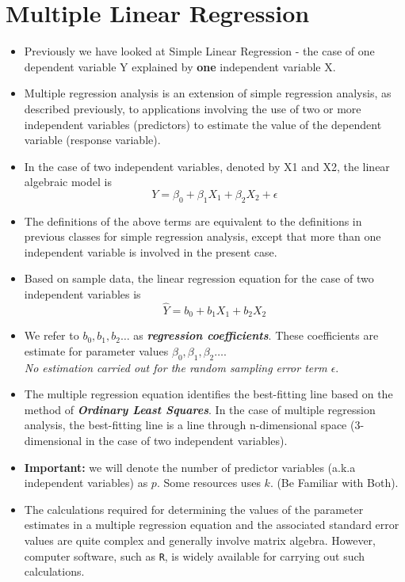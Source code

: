 \documentclass[a4paper,12pt]{article}
\begin{document}
\section{Multiple Linear Regression} 
\large
\begin{itemize}
\item Previously we have looked at Simple Linear Regression -  the case of one dependent variable Y explained by \textbf{one} independent variable X. 

\item Multiple regression analysis is an extension of simple regression analysis, as described previously, to applications involving the use of two or more independent variables (predictors) to estimate the value of the dependent variable (response variable).

\item In the case of two independent variables, denoted by X1 and X2, the linear algebraic model is
\[ Y= \beta_0 + \beta_1 X_1 + \beta_2 X_2 + \epsilon \]

\item The definitions of the above terms are equivalent to the definitions in previous classes for simple regression analysis, except that more than one independent variable is involved in the present case.
\item 
Based on sample data, the linear regression equation for the case of two independent variables is
\[ \hat{Y} = b_0 + b_1 X_1 + b_2 X_2 \]
\item We refer to $b_0, b_1 , b_2 \ldots$ as \textbf{\textit{regression coefficients}}. These coefficients are estimate for parameter values $\beta_0 , \beta_1 , \beta_2 \ldots$. \\ \textit{No estimation carried out for the random sampling error term $\epsilon$}.

\item The multiple regression equation identifies the best-fitting line based on the method of \textbf{\textit{Ordinary Least Squares}}. In the case of multiple regression analysis, the best-fitting line is a line through n-dimensional space (3-dimensional in the case of two independent variables).

\newpage

\item \textbf{Important:}  we will denote the number of predictor variables (a.k.a independent variables) as $p$. Some resources uses $k$.
(Be Familiar with Both).

\item The calculations required for determining the values of the parameter estimates in a multiple regression equation and the associated standard error values are quite complex and generally involve matrix algebra. However, computer software, such as \texttt{R}, is widely available for carrying out such calculations.
\end{itemize}
\newpage
\end{document}

